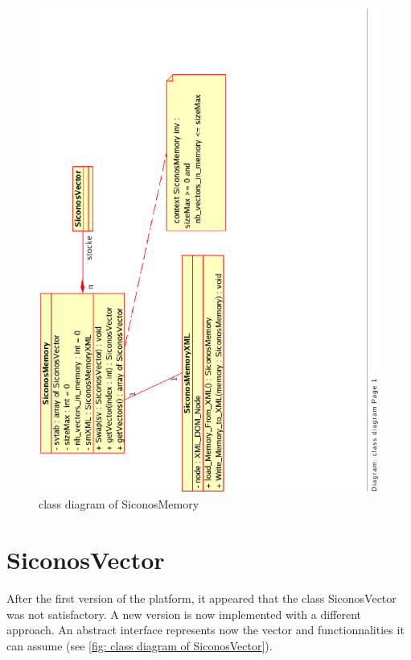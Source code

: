 \begin{figure}[h]
\begin{center}
\includegraphics[scale=0.75, angle=-90, bb=20 40 330 710, clip]{figure/SiconosMemory.ps}
\caption{class diagram of SiconosMemory}
\label{fig: class diagram of SiconosMemory}
\end{center}
\end{figure}

\pagebreak
\section{SiconosVector}

After the first version of the platform, it appeared that the class SiconosVector was not satisfactory. A new version is now implemented with a different approach. An abstract interface represents now the vector and functionnalities it can assume (see \ref{fig: class diagram of SiconosVector}). \\

